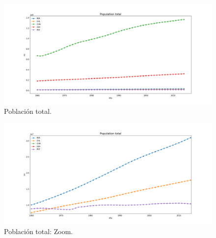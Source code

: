 \documentclass{article}
\begin{document}
\begin{figure}
	\centering
	\includegraphics[scale=0.38]{images/populationtotal.png}
	\caption{Población total.}
	\label{fig:12}
\end{figure}

\begin{figure}
	\centering
	\includegraphics[scale=0.38]{images/pt-zoom.png}
	\caption{Población total: Zoom.}
	\label{fig:13}
\end{figure}
\end{document}
